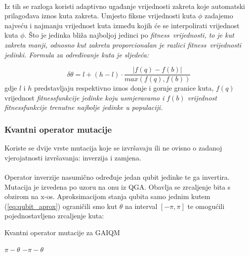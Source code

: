 \documentclass[times, utf8, zavrsni, numeric]{fer}
\begin{document}
\paragraph{}
Iz tih se razloga koristi adaptivno ugađanje vrijednosti zakreta koje automatski prilagođava iznos kuta zakreta. \citep{adaptive_qga} Umjesto fiksne vrijednosti kuta $\phi$ zadajemo najveću i najmanju vrijednost kuta između kojih će se interpolirati vrijednost kuta $\phi$. Što je jedinka bliža najboljoj jedinci po \it fitness\rm\ vrijednosti, to je kut zakreta manji, odnosno kut zakreta proporcionalan je razlici \it fitness\rm\ vrijednosti jedinki. Formula za određivanje kuta je sljedeća:

\begin{equation}
\label{eq:adapt}
\delta\theta = l + (h - l) \cdot \frac{|f(q) - f(b)|}{max(f(q), f(b))}
\end{equation}
gdje $l$ i $h$ predstavljaju respektivno iznos donje i gornje granice kuta, $f(q)$ vrijednost \it fitness\rm funkcije jedinke koju usmjeravamo i $f(b)$ vrijednost \it fitness\rm funkcije trenutne najbolje jedinke u populaciji.

\subsubsection{Kvantni operator mutacije}
Koriste se dvije vrste mutacija koje se izvršavaju ili ne ovisno o zadanoj vjerojatnosti izvršavanja: inverzija i zamjena.

\paragraph{}
Operator inverzije nasumično određuje jedan qubit jedinke te ga invertira. Mutacija je izvedena po uzoru na onu iz QGA. Obavlja se zrcaljenje bita s obzirom na x-os. Aproksimacijom stanja qubita samo jednim kutem (\ref{eq:qubit_aprox}) ograničili smo kut $\theta$ na interval $[-\pi, \pi]$ te omogućili pojednostavljeno zrcaljenje kuta:
\begin{algorithm}
\caption{Kvantni operator mutacije za GAIQM}
\label{algo:gaiqm_mut}
\begin{algorithmic}
\RETURN $\pi - \theta$
\ELSE
\RETURN $-\pi - \theta$
\ENDIF
\end{algorithmic}
\end{algorithm}
\end{document}
